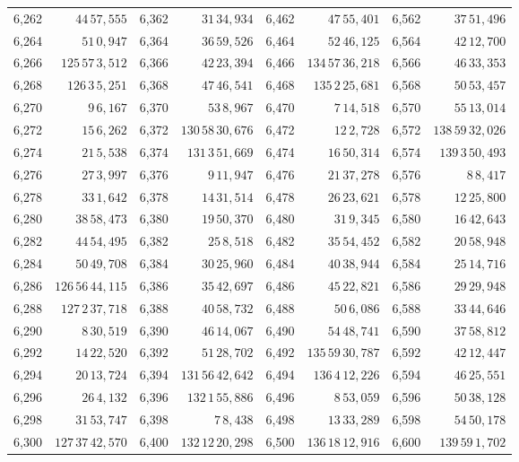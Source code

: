 \begin{tabular}{|r|r||r|r||r|r||r|r|}
6,262 & \(44\,57,\!555\) & 6,362 & \(31\,34,\!934\) & 6,462 & \(47\,55,\!401\) & 6,562 & \(37\,51,\!496\) \\
6,264 & \(51\,0,\!947\) & 6,364 & \(36\,59,\!526\) & 6,464 & \(52\,46,\!125\) & 6,564 & \(42\,12,\!700\) \\
6,266 & \(125\,57\,3,\!512\) & 6,366 & \(42\,23,\!394\) & 6,466 & \(134\,57\,36,\!218\) & 6,566 & \(46\,33,\!353\) \\
6,268 & \(126\,3\,5,\!251\) & 6,368 & \(47\,46,\!541\) & 6,468 & \(135\,2\,25,\!681\) & 6,568 & \(50\,53,\!457\) \\
6,270 & \(9\,6,\!167\) & 6,370 & \(53\,8,\!967\) & 6,470 & \(7\,14,\!518\) & 6,570 & \(55\,13,\!014\) \\[1pt]
6,272 & \(15\,6,\!262\) & 6,372 & \(130\,58\,30,\!676\) & 6,472 & \(12\,2,\!728\) & 6,572 & \(138\,59\,32,\!026\) \\
6,274 & \(21\,5,\!538\) & 6,374 & \(131\,3\,51,\!669\) & 6,474 & \(16\,50,\!314\) & 6,574 & \(139\,3\,50,\!493\) \\
6,276 & \(27\,3,\!997\) & 6,376 & \(9\,11,\!947\) & 6,476 & \(21\,37,\!278\) & 6,576 & \(8\,8,\!417\) \\
6,278 & \(33\,1,\!642\) & 6,378 & \(14\,31,\!514\) & 6,478 & \(26\,23,\!621\) & 6,578 & \(12\,25,\!800\) \\
6,280 & \(38\,58,\!473\) & 6,380 & \(19\,50,\!370\) & 6,480 & \(31\,9,\!345\) & 6,580 & \(16\,42,\!643\) \\[1pt]
6,282 & \(44\,54,\!495\) & 6,382 & \(25\,8,\!518\) & 6,482 & \(35\,54,\!452\) & 6,582 & \(20\,58,\!948\) \\
6,284 & \(50\,49,\!708\) & 6,384 & \(30\,25,\!960\) & 6,484 & \(40\,38,\!944\) & 6,584 & \(25\,14,\!716\) \\
6,286 & \(126\,56\,44,\!115\) & 6,386 & \(35\,42,\!697\) & 6,486 & \(45\,22,\!821\) & 6,586 & \(29\,29,\!948\) \\
6,288 & \(127\,2\,37,\!718\) & 6,388 & \(40\,58,\!732\) & 6,488 & \(50\,6,\!086\) & 6,588 & \(33\,44,\!646\) \\
6,290 & \(8\,30,\!519\) & 6,390 & \(46\,14,\!067\) & 6,490 & \(54\,48,\!741\) & 6,590 & \(37\,58,\!812\) \\[1pt]
6,292 & \(14\,22,\!520\) & 6,392 & \(51\,28,\!702\) & 6,492 & \(135\,59\,30,\!787\) & 6,592 & \(42\,12,\!447\) \\
6,294 & \(20\,13,\!724\) & 6,394 & \(131\,56\,42,\!642\) & 6,494 & \(136\,4\,12,\!226\) & 6,594 & \(46\,25,\!551\) \\
6,296 & \(26\,4,\!132\) & 6,396 & \(132\,1\,55,\!886\) & 6,496 & \(8\,53,\!059\) & 6,596 & \(50\,38,\!128\) \\
6,298 & \(31\,53,\!747\) & 6,398 & \(7\,8,\!438\) & 6,498 & \(13\,33,\!289\) & 6,598 & \(54\,50,\!178\) \\
6,300 & \(127\,37\,42,\!570\) & 6,400 & \(132\,12\,20,\!298\) & 6,500 & \(136\,18\,12,\!916\) & 6,600 & \(139\,59\,1,\!702\) \\
\hline
\end{tabular}\par
\endgroup
\clearpage
